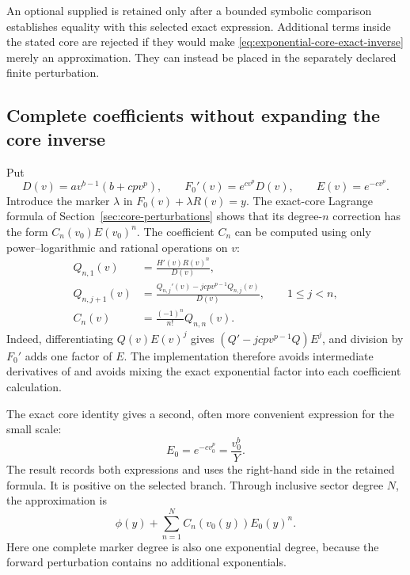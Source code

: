 An optional supplied  is retained only after a bounded
symbolic comparison establishes equality with this selected exact
expression. Additional terms inside the stated core are rejected if they
would make \eqref{eq:exponential-core-exact-inverse} merely an approximation.
They can instead be placed in the separately declared finite perturbation.

\subsection{Complete coefficients without expanding the core inverse}

Put
\begin{equation}
 D(v)=a v^{b-1}(b+cpv^p),\qquad
 F_0'(v)=e^{cv^p}D(v),\qquad E(v)=e^{-cv^p}.
 \label{eq:exponential-core-derivative}
\end{equation}
Introduce the marker $\lambda$ in $F_0(v)+\lambda R(v)=y$.
The exact-core Lagrange formula of Section~\ref{sec:core-perturbations}
shows that its degree-$n$ correction has the form
$C_n(v_0)E(v_0)^n$. The coefficient $C_n$ can be computed using only
power--logarithmic and rational operations on $v$:
\begin{align}
 Q_{n,1}(v)&=\frac{H'(v)R(v)^n}{D(v)},
 \label{eq:exponential-core-coefficient-initial}\\
 Q_{n,j+1}(v)&=
 \frac{Q_{n,j}'(v)-jcpv^{p-1}Q_{n,j}(v)}{D(v)},
 \qquad 1\le j<n,\label{eq:exponential-core-coefficient-recursion}\\
 C_n(v)&=\frac{(-1)^n}{n!}Q_{n,n}(v).
 \label{eq:exponential-core-coefficient-final}
\end{align}
Indeed, differentiating $Q(v)E(v)^j$ gives
$(Q'-jcpv^{p-1}Q)E^j$, and division by $F_0'$ adds one factor of $E$.
The implementation therefore avoids intermediate derivatives of
 and avoids mixing the exact exponential factor into each
coefficient calculation.

The exact core identity gives a second, often more convenient expression
for the small scale:
\begin{equation}
 E_0=e^{-cv_0^p}=\frac{v_0^b}{Y}.
 \label{eq:exponential-core-target-sector}
\end{equation}
The result records both expressions and uses the right-hand side in the
retained formula. It is positive on the selected branch. Through inclusive
sector degree $N$, the approximation is
\begin{equation}
 \phi(y)+\sum_{n=1}^N C_n(v_0(y))E_0(y)^n.
 \label{eq:exponential-core-retained-sectors}
\end{equation}
Here one complete marker degree is also one exponential degree, because
the forward perturbation contains no additional exponentials.

